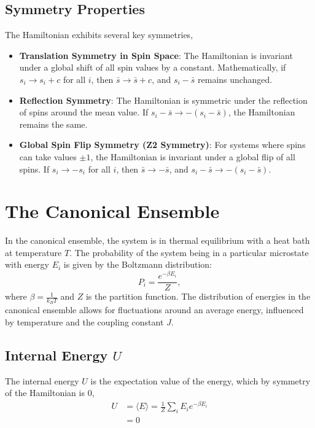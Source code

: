 \documentclass{article}
\begin{document}
\subsection{Symmetry Properties}
The Hamiltonian exhibits several key symmetries,
\begin{itemize}
    \item \textbf{Translation Symmetry in Spin Space}: The Hamiltonian is invariant under a global shift of all spin values by a constant. Mathematically, if \( s_i \to s_i + c \) for all \( i \), then \( \bar{s} \to \bar{s} + c \), and \( s_i - \bar{s} \) remains unchanged.
    \item \textbf{Reflection Symmetry}: The Hamiltonian is symmetric under the reflection of spins around the mean value. If \( s_i - \bar{s} \to - (s_i - \bar{s}) \), the Hamiltonian remains the same.
    \item \textbf{Global Spin Flip Symmetry (Z2 Symmetry)}: For systems where spins can take values \(\pm 1\), the Hamiltonian is invariant under a global flip of all spins. If \( s_i \to -s_i \) for all \( i \), then \( \bar{s} \to -\bar{s} \), and \( s_i - \bar{s} \to - (s_i - \bar{s}) \).
\end{itemize}

\section{The Canonical Ensemble}
In the canonical ensemble, the system is in thermal equilibrium with a heat bath at temperature \( T \). The probability of the system being in a particular microstate with energy \( E_i \) is given by the Boltzmann distribution:
\begin{equation}
P_i = \frac{e^{-\beta E_i}}{Z},
\end{equation}
where \( \beta = \frac{1}{k_B T} \) and \( Z \) is the partition function. The distribution of energies in the canonical ensemble allows for fluctuations around an average energy, influenced by temperature and the coupling constant \( J \).

\subsection{Internal Energy \( U \)}

The internal energy \( U \) is the expectation value of the energy, which by symmetry of the Hamiltonian is 0,
\begin{align}
U &= \langle E \rangle = \frac{1}{Z} \sum_i E_i e^{-\beta E_i}\\
&=0
\end{align}




\nocite{*}
\end{document}
